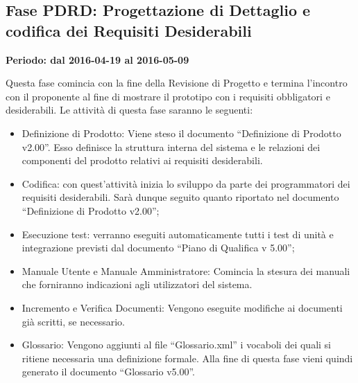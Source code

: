 \documentclass[../PianoProgetto.tex]{subfiles}
\begin{document}
	\subsection{Fase PDRD: Progettazione di Dettaglio e codifica dei Requisiti Desiderabili}
		\textbf{Periodo: dal 2016-04-19 al 2016-05-09}
		
		Questa fase comincia con la fine della Revisione di Progetto e termina l’incontro con il proponente al fine di mostrare il prototipo con i requisiti obbligatori e desiderabili. Le attività di questa fase saranno le seguenti:

		\begin{itemize}
			\item Definizione di Prodotto: Viene steso il documento “Definizione di Prodotto v2.00”. Esso definisce la struttura interna del sistema e le relazioni dei componenti del prodotto relativi ai requisiti desiderabili.

			\item Codifica: con quest’attività inizia lo sviluppo da parte dei programmatori dei requisiti desiderabili. Sarà dunque seguito quanto riportato nel documento “Definizione di Prodotto v2.00”;

	 		\item Esecuzione test: verranno eseguiti automaticamente tutti i test di unità e integrazione previsti dal documento “Piano di Qualifica v 5.00”;

			\item Manuale Utente e Manuale Amministratore: Comincia la stesura dei manuali che forniranno indicazioni agli utilizzatori del sistema.

			\item Incremento e Verifica Documenti: Vengono eseguite modifiche ai documenti già scritti, se necessario.

			\item Glossario: Vengono aggiunti al file “Glossario.xml” i vocaboli dei quali si ritiene necessaria una definizione formale. Alla fine di questa fase vieni quindi generato il documento “Glossario v5.00”.
		\end{itemize}
		
\end{document}
